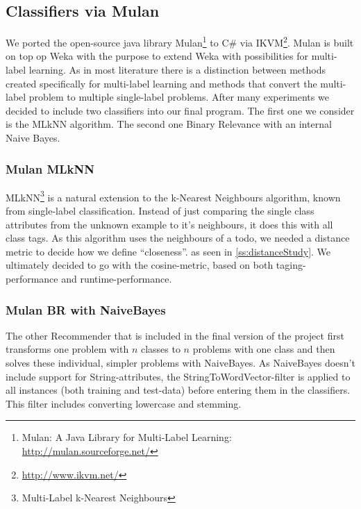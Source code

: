 \documentclass[a4paper,titlepage]{article}
\begin{document}
\subsection{Classifiers via Mulan}


We ported the open-source java library Mulan\footnote{Mulan: A Java Library for Multi-Label Learning: \url{http://mulan.sourceforge.net/}} to C\# via IKVM\footnote{\url{http://www.ikvm.net/}}. Mulan is built on top op Weka with the purpose to extend Weka with possibilities for multi-label learning.
As in most literature there is a distinction between methods created specifically for multi-label learning and methods that convert the multi-label problem to multiple single-label problems.
After many experiments we decided to include two classifiers into our final program.
The first one we consider is the MLkNN algorithm. The second one Binary Relevance with an internal Naive Bayes.

\subsubsection{Mulan MLkNN}
MLkNN\footnote{Multi-Label k-Nearest Neighbours} is a natural extension to the k-Nearest Neighbours algorithm, known from single-label classification. Instead of just comparing the single class attributes from the unknown example to it's neighbours, it does this with all class tags.
As this algorithm uses the neighbours of a todo, we needed a distance metric to decide how we define ``closeness''.  as seen in \ref{ss:distanceStudy}. We ultimately decided to go with the cosine-metric, based on both taging-performance and runtime-performance.

\subsubsection{Mulan BR with NaiveBayes}
The other Recommender that is included in the final version of the project first transforms one problem with $n$ classes to $n$ problems with one class and then solves these individual, simpler problems with NaiveBayes. As NaiveBayes doesn't include support for String-attributes, the StringToWordVector-filter is applied to all instances (both training and test-data) before entering them in the classifiers. This filter includes converting lowercase and stemming.
\end{document}
